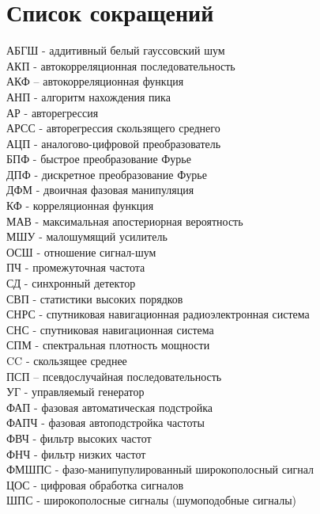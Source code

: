 \chapter*{Список сокращений}
\noindent
АБГШ - аддитивный белый гауссовский шум				\\
АКП - автокорреляционная последовательность			\\
АКФ – автокорреляционная функция				\\
АНП - алгоритм нахождения пика					\\
АР - авторегрессия						\\
АРСС - авторегрессия скользящего среднего			\\
АЦП - аналогово-цифровой преобразователь			\\
БПФ - быстрое преобразование Фурье				\\
ДПФ - дискретное преобразование Фурье				\\
ДФМ - двоичная фазовая манипуляция				\\
КФ - корреляционная функция					\\
МАВ - максимальная апостериорная вероятность			\\
МШУ - малошумящий усилитель					\\
ОСШ - отношение сигнал-шум 					\\
ПЧ - промежуточная частота					\\
СД - синхронный детектор					\\
СВП - статистики высоких порядков				\\
СНРС - спутниковая навигационная радиоэлектронная система	\\
СНС - спутниковая навигационная система				\\
СПМ - спектральная плотность мощности				\\
CC - скользящее среднее						\\
ПСП – псевдослучайная последовательность			\\
УГ - управляемый генератор					\\
ФАП - фазовая автоматическая подстройка				\\
ФАПЧ - фазовая автоподстройка частоты				\\
ФВЧ - фильтр высоких частот					\\
ФНЧ - фильтр низких частот					\\
ФМШПС - фазо-манипупулированный широкополосный сигнал		\\
ЦОС - цифровая обработка сигналов				\\
ШПС -  широкополосные сигналы (шумоподобные сигналы)		\\


